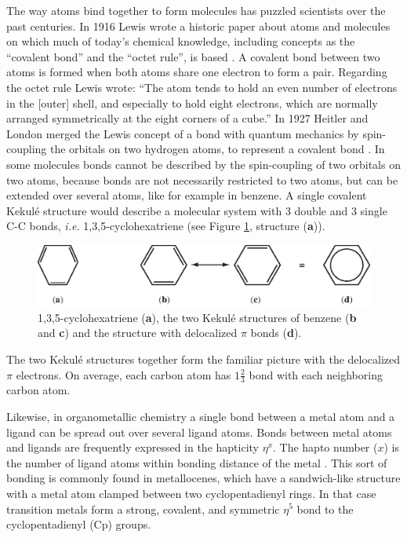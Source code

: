 The way atoms bind together to form molecules has puzzled scientists over the past centuries. In 1916 Lewis wrote a historic paper about atoms and molecules on which much of today's chemical knowledge, including concepts as the ``covalent bond'' and the ``octet rule'', is based \cite{lewis}. A covalent bond between two atoms is formed when both atoms share one electron to form a pair. Regarding the octet rule Lewis wrote: ``The atom tends to hold an even number of electrons in the [outer] shell, and especially to hold eight electrons, which are normally arranged symmetrically at the eight corners of a cube.'' In 1927 Heitler and London merged the Lewis concept of a bond with quantum mechanics  by spin-coupling the orbitals on two hydrogen atoms, to represent a covalent bond \cite{heitler}. In some molecules bonds cannot be described by the spin-coupling of two orbitals on two atoms, because bonds are not necessarily restricted to two atoms, but can be extended over several atoms, like for example in benzene. A single covalent Kekul\'{e} structure would describe a molecular system with 3 double and 3 single C-C bonds, \textit{i.e.} 1,3,5-cyclohexatriene (see Figure \ref{ch4.fig.cyclohexatriene}, structure (\textbf{a})).
\begin{figure}[hbtp]
\center
\includegraphics[scale=0.8]{cyclopentadienyl/figures/cyclohexatriene.eps}
\caption{1,3,5-cyclohexatriene (\textbf{a}), the two Kekul\'{e} structures of benzene (\textbf{b} and \textbf{c}) and the structure with delocalized $\pi$ bonds (\textbf{d}).}
\label{ch4.fig.cyclohexatriene}
\end{figure}
The two Kekul\'{e} structures together form the familiar picture with the delocalized $\pi$ electrons. On average, each carbon atom has $1\frac{2}{3}$ bond with each neighboring carbon atom.

Likewise, in organometallic chemistry a single bond between a metal atom and a ligand can be spread out over several ligand atoms. Bonds between metal atoms and ligands are frequently expressed in the hapticity $\eta^x$. The hapto number ($x$) is the number of ligand atoms within bonding distance of the metal \cite{powell}. This sort of bonding is commonly found in metallocenes, which have a sandwich-like structure with a metal atom clamped between two cyclopentadienyl rings. In that case transition metals form a strong, covalent, and symmetric $\eta^{5}$ bond to the cyclopentadienyl (Cp) groups.

